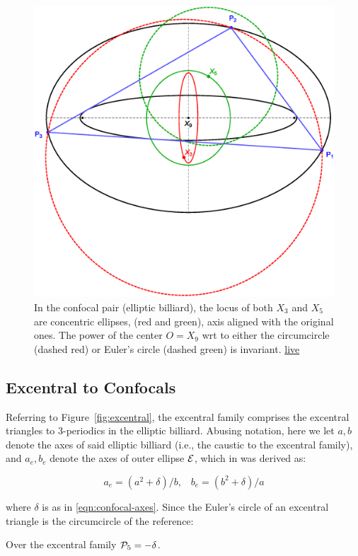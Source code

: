 \begin{figure}
    \centering
    \includegraphics[width=.7\textwidth]{pics/0050_n3_confocal.eps}
    \caption{In the confocal pair (elliptic billiard), the locus of both $X_3$ and $X_5$ are concentric ellipses, (red and green), axis aligned with the original ones. The power of the center $O=X_9$ wrt to either the circumcircle (dashed red) or Euler's circle (dashed green) is invariant. \href{https://bit.ly/3w151N5}{live}}
    \label{fig:confocal}
\end{figure}

\subsection{Excentral to Confocals}

Referring to Figure~\ref{fig:excentral}, the excentral family comprises the excentral triangles to 3-periodics in the elliptic billiard. Abusing notation, here we let $a,b$ denote the axes of said elliptic billiard (i.e., the caustic to the excentral family), and $a_e,b_e$ denote the axes of outer ellipse $\E$, which in \cite{garcia2019-incenter} was derived as:

\begin{equation}
a_e = (a^2+\delta)/b, \;\;\;b_e = (b^2+\delta)/a
\label{eqn:excentrals}
\end{equation}

\noindent where $\delta$ is as in \eqref{eqn:confocal-axes}. Since the Euler's circle of an excentral triangle is the circumcircle of the reference:

\begin{observation}
Over the excentral family $\P_5=-\delta$.
\end{observation}

